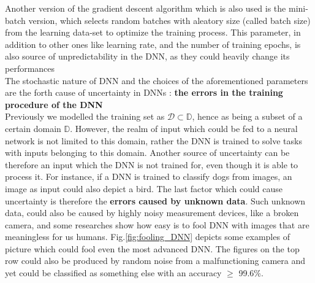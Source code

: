 Another version of the gradient descent algorithm which is also used is the mini-batch version, which selects random batches with aleatory size (called batch size) from the learning data-set to optimize the training process. \cite{ruder2017overview} This parameter, in addition to other ones like learning rate, and the number of training epochs, is also source of unpredictability in the DNN, as they could heavily change its performances  \\
The stochastic nature of DNN and the choices of the aforementioned parameters are the forth cause of uncertainty in DNNs : \textbf{the errors in the training procedure of the DNN}\\
Previously we modelled the training set as $\mathcal{D} \subset \mathbb{D}$, hence as being a subset of a certain domain $\mathbb{D}$. However, the realm of input which could be fed to a neural network is not limited to this domain, rather the DNN is trained to solve tasks with inputs belonging to this domain. Another source of uncertainty can be therefore an input which the DNN is not trained for, even though it is able to process it. For instance, if a DNN is trained to classify dogs from images, an image as input could also depict a bird. The last factor which could cause uncertainty is therefore the \textbf{errors caused by unknown data}. Such unknown data, could also be caused by highly noisy measurement devices, like a broken camera, and some researches show how easy is to fool DNN with images that are meaningless for us humans.\cite{nguyen2015deep} Fig.\ref{fig:fooling_DNN} depicts some examples of picture which could fool even the most advanced DNN. The figures on the top row could also be produced by random noise from a malfunctioning camera and yet could be classified as something else with an accuracy $\geq$ 99.6\%. \cite{nguyen2015deep}\\
